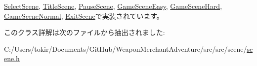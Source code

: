 \mbox{\hyperlink{class_select_scene_a0cef696ddf74155e061cc5f9f2e06419}{Select\+Scene}}, \mbox{\hyperlink{class_title_scene_ab3097e96e2fe65d6fad0d6bb45a14f9f}{Title\+Scene}}, \mbox{\hyperlink{class_pause_scene_a6adfe0685eb6bc64e658f6364c9f704d}{Pause\+Scene}}, \mbox{\hyperlink{class_game_scene_easy_ac2bccbf61722010fd6f317693ee7b8b1}{Game\+Scene\+Easy}}, \mbox{\hyperlink{class_game_scene_hard_ac132a0e281a7d4e6b71deb6e5bcfdb9d}{Game\+Scene\+Hard}}, \mbox{\hyperlink{class_game_scene_normal_a3e45ac3882f1d0dd5c77ab4f0a1ccb33}{Game\+Scene\+Normal}}, \mbox{\hyperlink{class_exit_scene_a18655f3124150a911f266e66e3fc4480}{Exit\+Scene}}で実装されています。



このクラス詳解は次のファイルから抽出されました\+:\begin{DoxyCompactItemize}
\item 
C\+:/\+Users/tokir/\+Documents/\+Git\+Hub/\+Weapon\+Merchant\+Adventure/src/src/scene/\mbox{\hyperlink{scene_8h}{scene.\+h}}\end{DoxyCompactItemize}
